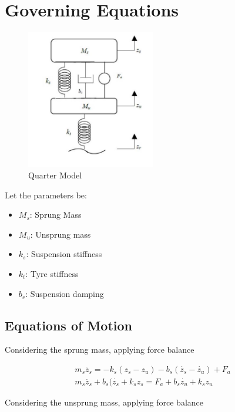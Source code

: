 \documentclass[12pt, a4paper, oneside]{report}
\begin{document}
\section{Governing Equations}

\begin{figure}[h]
        \centering
        \includegraphics[width=0.5\textwidth]{images/quarter_model.png}
        \caption{Quarter Model}
    \end{figure}

Let the parameters be:
\begin{itemize}
    \item  $M_s$: Sprung Mass
    \item $M_u$: Unsprung mass
    \item $k_s$: Suspension stiffness
    \item $k_t$: Tyre stiffness
    \item $b_s$: Suspension damping 
\end{itemize}

\subsection{Equations of Motion}
Considering the sprung mass, applying force balance

\begin{equation}
    \begin{aligned}
        m_s \ddot{z_s} = -k_s (z_s - z_u) - b_s (\dot{z_s} - \dot{z_u}) + F_a \\
        m_s \ddot{z_s} + b_s (\dot{z_s} + k_s z_s = F_a + b_s \dot{z_u} + k_s z_u
    \end{aligned}
\end{equation}

Considering the unsprung mass, applying force balance
\end{document}
